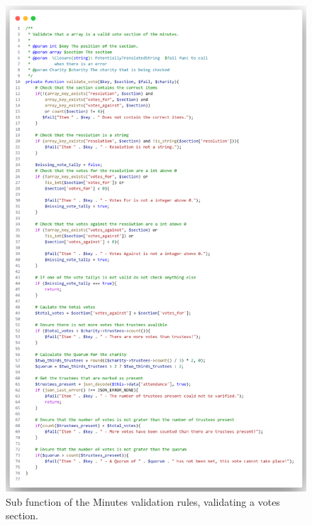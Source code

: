 \documentclass{UoYCSproject}
\begin{document}
\begin{figure}[H]
\begin{center}
\includegraphics[width=\textwidth]{"./assets/apendix/rules-code-screenshots/Minutes - Votes v2.png"}
\end{center}
\label{fig:vote_validateion_code}
\caption{Sub function of the Minutes validation rules, validating a votes section.}
\end{figure}
\end{document}
